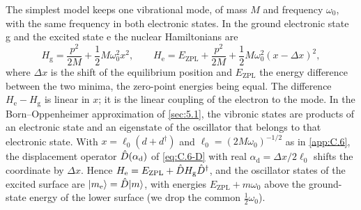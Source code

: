The simplest model keeps one vibrational mode, of mass $M$ and frequency $\omega_0$, with the same frequency in both electronic states. In the ground electronic state g and the excited state e the nuclear Hamiltonians are
\begin{equation}
  H_{\mathrm{g}} = \frac{p^2}{2M} + \frac12M\omega_0^2x^2 , \qquad
  H_{\mathrm{e}} = E_{\mathrm{ZPL}} + \frac{p^2}{2M} + \frac12M\omega_0^2(x - \Delta x)^2 ,
  \label{eq:5.6-Hge}
\end{equation}
where $\Delta x$ is the shift of the equilibrium position and $E_{\mathrm{ZPL}}$ the energy difference between the two minima, the zero-point energies being equal. The difference $H_{\mathrm{e}} - H_{\mathrm{g}}$ is linear in $x$; it is the linear coupling of the electron to the mode. In the Born--Oppenheimer approximation of \cref{sec:5.1}, the vibronic states are products of an electronic state and an eigenstate of the oscillator that belongs to that electronic state. With $x = \ell_0(d + d^\dagger)$ and $\ell_0 = (2M\omega_0)^{-1/2}$ as in \cref{app:C.6}, the displacement operator $\hat{D}(\alpha_{\mathrm{d}})$ of \cref{eq:C.6-D} with real $\alpha_{\mathrm{d}} = \Delta x/2\ell_0$ shifts the coordinate by $\Delta x$. Hence $H_{\mathrm{e}} = E_{\mathrm{ZPL}} + \hat{D}H_{\mathrm{g}}\hat{D}^\dagger$, and the oscillator states of the excited surface are $|m_{\mathrm{e}}\rangle = \hat{D}|m\rangle$, with energies $E_{\mathrm{ZPL}} + m\omega_0$ above the ground-state energy of the lower surface (we drop the common $\tfrac12\omega_0$).

